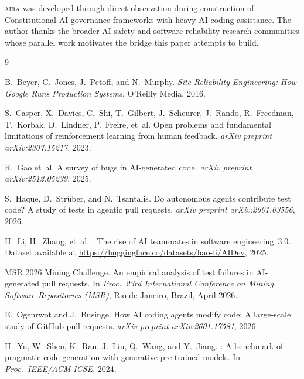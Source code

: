 \documentclass[11pt]{article}
\newcommand{\aira}{\textsc{aira}}
\begin{document}
\aira{} was developed through direct observation during construction of Constitutional AI
governance frameworks with heavy AI coding assistance. The author thanks the broader AI
safety and software reliability research communities whose parallel work motivates the bridge
this paper attempts to build.


\begin{thebibliography}{9}

B.~Beyer, C.~Jones, J.~Petoff, and N.~Murphy.
\newblock \emph{Site Reliability Engineering: How Google Runs Production Systems}.
\newblock O'Reilly Media, 2016.

S.~Casper, X.~Davies, C.~Shi, T.~Gilbert, J.~Scheurer, J.~Rando, R.~Freedman,
T.~Korbak, D.~Lindner, P.~Freire, et~al.
\newblock Open problems and fundamental limitations of reinforcement learning from
human feedback.
\newblock \emph{arXiv preprint arXiv:2307.15217}, 2023.

R.~Gao et~al.
\newblock A survey of bugs in AI-generated code.
\newblock \emph{arXiv preprint arXiv:2512.05239}, 2025.

S.~Haque, D.~Str{\"u}ber, and N.~Tsantalis.
\newblock Do autonomous agents contribute test code? {A} study of tests in
agentic pull requests.
\newblock \emph{arXiv preprint arXiv:2601.03556}, 2026.

H.~Li, H.~Zhang, et~al.
: The rise of {AI} teammates in software engineering~3.0.
\newblock Dataset available at \url{https://huggingface.co/datasets/hao-li/AIDev}, 2025.

MSR 2026 Mining Challenge.
\newblock An empirical analysis of test failures in AI-generated pull requests.
\newblock In \emph{Proc.\ 23rd International Conference on Mining Software Repositories
(MSR)}, Rio de Janeiro, Brazil, April 2026.

E.~Ogenrwot and J.~Businge.
\newblock How {AI} coding agents modify code: {A} large-scale study of {GitHub}
pull requests.
\newblock \emph{arXiv preprint arXiv:2601.17581}, 2026.

H.~Yu, W.~Shen, K.~Ran, J.~Liu, Q.~Wang, and Y.~Jiang.
: A benchmark of pragmatic code generation with generative
pre-trained models.
\newblock In \emph{Proc.\ IEEE/ACM ICSE}, 2024.

\end{thebibliography}
\end{document}
